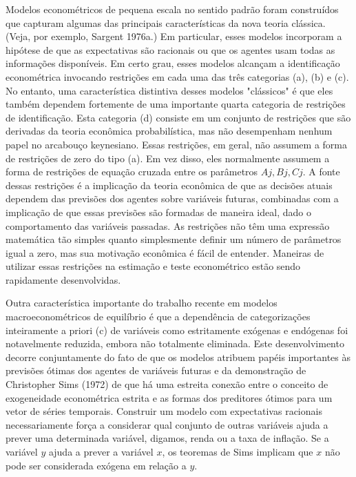 \documentclass[12pt]{article}
\begin{document}
Modelos econométricos de pequena escala no sentido padrão foram construídos que capturam algumas das principais características da nova teoria clássica. (Veja, por exemplo, Sargent 1976a.) Em particular, esses modelos incorporam a hipótese de que as expectativas são racionais ou que os agentes usam todas as informações disponíveis. Em certo grau, esses modelos alcançam a identificação econométrica invocando restrições em cada uma das três categorias (a), (b) e (c). No entanto, uma característica distintiva desses modelos "clássicos" é que eles também dependem fortemente de uma importante quarta categoria de restrições de identificação. Esta categoria (d) consiste em um conjunto de restrições que são derivadas da teoria econômica probabilística, mas não desempenham nenhum papel no arcabouço keynesiano. Essas restrições, em geral, não assumem a forma de restrições de zero do tipo (a). Em vez disso, eles normalmente assumem a forma de restrições de equação cruzada entre os parâmetros $Aj, Bj, Cj$. A fonte dessas restrições é a implicação da teoria econômica de que as decisões atuais dependem das previsões dos agentes sobre variáveis futuras, combinadas com a implicação de que essas previsões são formadas de maneira ideal, dado o comportamento das variáveis passadas. As restrições não têm uma expressão matemática tão simples quanto simplesmente definir um número de parâmetros igual a zero, mas sua motivação econômica é fácil de entender. Maneiras de utilizar essas restrições na estimação e teste econométrico estão sendo rapidamente desenvolvidas.

Outra característica importante do trabalho recente em modelos macroeconométricos de equilíbrio é que a dependência de categorizações inteiramente a priori (c) de variáveis como estritamente exógenas e endógenas foi notavelmente reduzida, embora não totalmente eliminada. Este desenvolvimento decorre conjuntamente do fato de que os modelos atribuem papéis importantes às previsões ótimas dos agentes de variáveis futuras e da demonstração de Christopher Sims (1972) de que há uma estreita conexão entre o conceito de exogeneidade econométrica estrita e as formas dos preditores ótimos para um vetor de séries temporais. Construir um modelo com expectativas racionais necessariamente força a considerar qual conjunto de outras variáveis ajuda a prever uma determinada variável, digamos, renda ou a taxa de inflação. Se a variável $y$ ajuda a prever a variável $x$, os teoremas de Sims implicam que $x$ não pode ser considerada exógena em relação a $y$.
\end{document}
